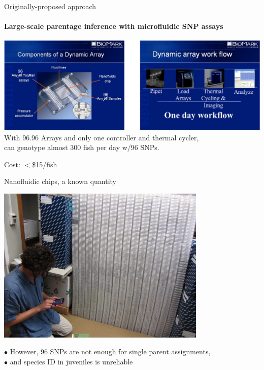 \documentclass[letter,graphicx]{beamer}
\begin{document}
\begin{frame}{Originally-proposed approach}
\framesubtitle{Large-scale parentage inference with microfluidic SNP assays}
\begin{center}
\mbox{}\hspace*{-.10\textwidth}
\includegraphics[width=1.16\textwidth]{mhap_figs/fluidigm.png}\\
With 96.96 Arrays and only one controller and thermal cycler, \\
can genotype almost 300 fish per day w/96 SNPs.

Cost: $<$\$15/fish 
\end{center}
\end{frame}








\begin{frame}{Nanofluidic chips, a known quantity}
\begin{center}
\includegraphics[width=0.75\textwidth]{mhap_figs/AC_calculating_chipwall.jpg}
\end{center}
$\bullet$ However, 96 SNPs are not enough for single parent assignments,\\
$\bullet$ and species ID in juveniles is unreliable
\end{frame}
\end{document}
